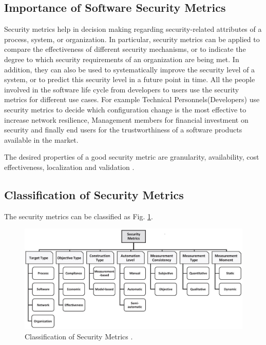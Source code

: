 \documentclass[pdftex,english,oribibl]{llncs}
\begin{document}
\subsection{Importance of Software Security Metrics}
Security metrics help in decision making regarding security-related attributes of a process, system, or organization. In particular, security metrics can be applied to compare the effectiveness of different security mechanisms, or to indicate the degree to which security requirements of an organization are being met. In addition, they can also be used to systematically improve the security level of a system, or to predict this security level in a future point in time. All the people involved in the software life cycle from developers to users use the security metrics for different use cases. For example Technical Personnels(Developers) use security metrics to decide which configuration change is the most effective to increase network resilience, Management members for financial investment on security and finally end users for the trustworthiness of a software products available in the market.

The desired properties of a good security metric are granularity, availability, cost effectiveness, localization and validation \cite{8017389_Ramos}. 
\subsection{Classification of Security Metrics}
The security metrics can be classified as Fig. \ref{fig:security_metric_types}.

\begin{figure}[h]
	\centering\includegraphics[width=\linewidth]{figures/security_metric_types.jpg}
	\caption{Classification of Security Metrics \cite{8017389_Ramos}.}
	\label{fig:security_metric_types}
\end{figure}
\end{document}
